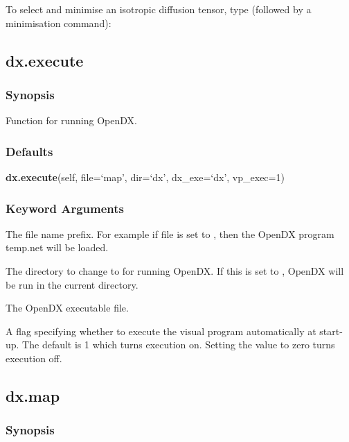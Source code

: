To select and minimise an isotropic diffusion tensor, type (followed by a minimisation
command):




\newpage

\subsection{dx.execute}


\subsubsection{Synopsis}

Function for running OpenDX.

\subsubsection{Defaults}

\textsf{\textbf{dx.execute}(self, file=`map', dir=`dx', dx\_exe=`dx', vp\_exec=1)}


\subsubsection{Keyword Arguments}


  The file name prefix.  For example if file is set to 
, then the OpenDX program temp.net will be loaded.

  The directory to change to for running OpenDX.  If this is set to 
, OpenDX will be run in the current directory.

  The OpenDX executable file.

  A flag specifying whether to execute the visual program automatically at start-up.  The default is 1 which turns execution on.  Setting the value to zero turns execution off.


\newpage

\subsection{dx.map}


\subsubsection{Synopsis}

